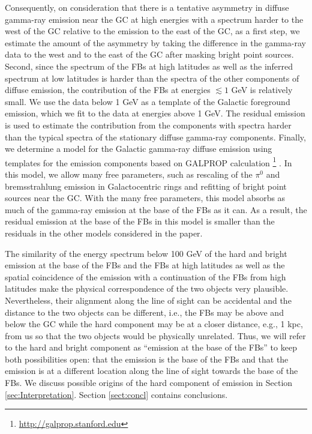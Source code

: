 Consequently, on consideration that there is a tentative asymmetry in diffuse gamma-ray emission near the GC at high energies with a spectrum
harder to the west of the GC relative to the emission to the east of the GC,
as a first step,
we estimate the amount of the asymmetry by taking the difference in the gamma-ray data to the west and to the east of the GC 
after masking bright point sources.
Second, since the spectrum of the FBs at high latitudes as well as the inferred spectrum at low latitudes
is harder than the spectra of the other components of diffuse emission,
the contribution of the FBs at energies $\lesssim 1$ GeV is relatively small. 
We use the data below 1 GeV as a template of the Galactic foreground emission, 
which we fit to the data at energies above 1 GeV.
The residual emission is used to estimate the contribution from the components with spectra harder than the typical 
spectra of the stationary diffuse gamma-ray components.
Finally, we determine a model for the Galactic gamma-ray diffuse emission using templates for the emission 
components based on GALPROP calculation%
\footnote{\url{http://galprop.stanford.edu}} 
\citep{Moskalenko:1997gh, Strong:1998fr, Strong:2004de, Ptuskin:2005ax, 2007ARNPS..57..285S, Porter:2008ve,Vladimirov:2010aq}. 
In this model, we allow many free parameters, such as rescaling of the $\pi^0$ and bremsstrahlung emission in Galactocentric rings and refitting of bright point sources near the GC.
With the many free parameters, this model absorbs as much of the gamma-ray emission at the base of the FBs as it can. As a result, the residual emission at the base of the FBs in this model is smaller than the residuals in the other models considered in the paper.

The similarity of the energy spectrum below 100 GeV of the hard and bright emission at the base of the FBs 
and the FBs at high latitudes as well as the spatial coincidence of the emission with a continuation of the FBs from high latitudes 
make the physical correspondence of the two objects very plausible.
Nevertheless, their alignment along the line of sight can be accidental and the distance to the two objects can be different, i.e., the FBs may be
above and below the GC while the hard component may be at a closer distance, e.g., 1 kpc, from us so that the two objects would be physically unrelated.
Thus, we will refer to the hard and bright component as ``emission at the base of the FBs'' to keep both possibilities open: 
that the emission is the base of the FBs and that the emission is at a different location along the line of sight towards the base of the FBs.
We discuss possible origins of the hard component of emission in Section \ref{sec:Interpretation}.
Section \ref{sect:concl} contains conclusions.
